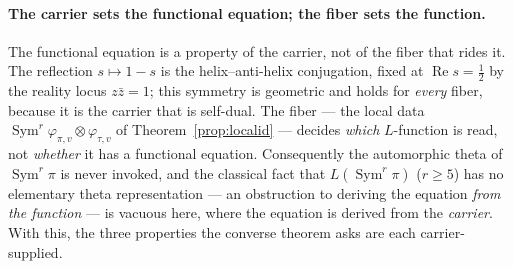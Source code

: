 \documentclass[11pt]{article}
\theoremstyle{definition}
\renewcommand{\Re}{\operatorname{Re}}
\newcommand{\Sym}{\operatorname{Sym}}
\begin{document}
\paragraph{The carrier sets the functional equation; the fiber sets the function.} The functional
equation is a property of the carrier, not of the fiber that rides it. The reflection $s\mapsto1-s$ is
the helix--anti-helix conjugation, fixed at $\Re s=\tfrac12$ by the reality locus $z\bar z=1$; this
symmetry is geometric and holds for \emph{every} fiber, because it is the carrier that is self-dual. The
fiber --- the local data $\Sym^r\varphi_{\pi,v}\otimes\varphi_{\tau,v}$ of
Theorem~\ref{prop:localid} --- decides \emph{which} $L$-function is read, not \emph{whether} it has a
functional equation. Consequently the automorphic theta of $\Sym^r\pi$ is never invoked, and the
classical fact that $L(\Sym^r\pi)$ ($r\ge5$) has no elementary theta representation --- an obstruction to
deriving the equation \emph{from the function} --- is vacuous here, where the equation is derived from
the \emph{carrier}. With this, the three properties the converse theorem asks are each carrier-supplied.
\end{document}
